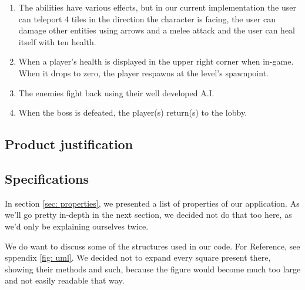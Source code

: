 \documentclass[../main.tex]{subfiles}
\begin{document}
\begin{enumerate}
		\item The abilities have various effects, but in our current implementation the user can teleport 4 tiles in the direction the character is facing, the user can damage other entities using arrows and a melee attack and the user can heal itself with ten health.
		\item When a player's health is displayed in the upper right corner when in-game. When it drops to zero, the player respawns at the level's spawnpoint.		
		\item The enemies fight back using their well developed A.I.
		\item When the boss is defeated, the player(s) return(s) to the lobby.
		
    \end{enumerate}

	\subsection{Product justification}

	\subsection{Specifications}
	In section \ref{sec: properties}, we presented a list of properties of our application. As we'll go pretty in-depth in the next section, we decided not do that too here, as we'd only be explaining ourselves twice. 
	
	We do want to discuss some of the structures used in our code. For Reference, see sppendix \ref{fig: uml}. We decided not to expand every square present there, showing their methods and such, because the figure would become much too large and not easily readable that way.
\end{document}

